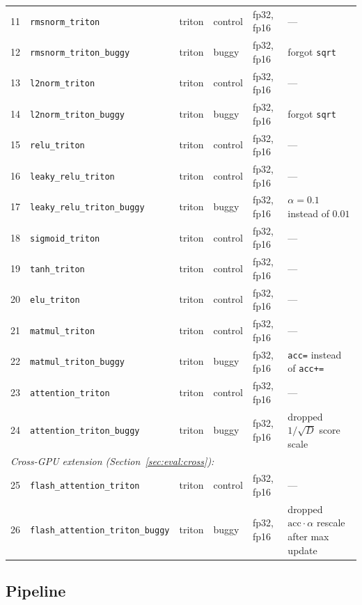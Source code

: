 \documentclass[runningheads]{llncs}
\begin{document}
\begin{table}[h]
{\begin{tabular}{rlllll}
11 & \texttt{rmsnorm\_triton}            & triton & control & fp32, fp16 & --- \\
12 & \texttt{rmsnorm\_triton\_buggy}     & triton & buggy   & fp32, fp16 & forgot \texttt{sqrt} \\
13 & \texttt{l2norm\_triton}             & triton & control & fp32, fp16 & --- \\
14 & \texttt{l2norm\_triton\_buggy}      & triton & buggy   & fp32, fp16 & forgot \texttt{sqrt} \\
15 & \texttt{relu\_triton}               & triton & control & fp32, fp16 & --- \\
16 & \texttt{leaky\_relu\_triton}        & triton & control & fp32, fp16 & --- \\
17 & \texttt{leaky\_relu\_triton\_buggy} & triton & buggy   & fp32, fp16 & $\alpha = 0.1$ instead of $0.01$ \\
18 & \texttt{sigmoid\_triton}            & triton & control & fp32, fp16 & --- \\
19 & \texttt{tanh\_triton}               & triton & control & fp32, fp16 & --- \\
20 & \texttt{elu\_triton}                & triton & control & fp32, fp16 & --- \\
21 & \texttt{matmul\_triton}             & triton & control & fp32, fp16 & --- \\
22 & \texttt{matmul\_triton\_buggy}      & triton & buggy   & fp32, fp16 & \texttt{acc=} instead of \texttt{acc+=} \\
23 & \texttt{attention\_triton}          & triton & control & fp32, fp16 & --- \\
24 & \texttt{attention\_triton\_buggy}   & triton & buggy   & fp32, fp16 & dropped $1/\sqrt{D}$ score scale \\
\midrule
\multicolumn{6}{l}{\textit{Cross-GPU extension (Section~\ref{sec:eval:cross}):}} \\
25 & \texttt{flash\_attention\_triton}        & triton & control & fp32, fp16 & --- \\
26 & \texttt{flash\_attention\_triton\_buggy} & triton & buggy   & fp32, fp16 & dropped $\text{acc}\cdot\alpha$ rescale after max update \\
\bottomrule
\end{tabular}%
}
\end{table}

\subsection{Pipeline}
\label{sec:method:pipeline}
\end{document}
